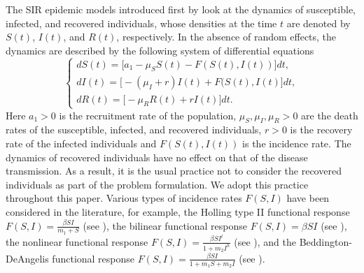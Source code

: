 \documentclass[12pt]{amsart}
\theoremstyle{remark}
\numberwithin{equation}{section}
\numberwithin{equation}{section}
\newcommand{\1}{\boldsymbol{1}}
\begin{document}
The SIR epidemic models introduced first by \cite{KER1,KER2} look at the dynamics of susceptible, infected, and recovered individuals, whose densities at the time $t$ are denoted by $S(t)$, $I(t)$, and $R(t)$, respectively. In the absence of random effects,
the dynamics  are
described
by the following system of differential equations
\begin{equation}\label{1.0}
\begin{cases}
dS(t)=\big[a_1-\mu_SS(t)-F(S(t),I(t))\big]dt, \\
dI(t)=\big[-(\mu_I+r)I(t) + F(S(t),I(t)\big]dt,\\
dR(t)=\big[-\mu_RR(t)+rI(t)\big]dt.
\end{cases}
\end{equation}
Here $a_1>0$ is the recruitment rate of the population, $\mu_S,\mu_I,\mu_R>0$ are the death rates of the susceptible, infected, and recovered individuals, $r>0$ is the recovery rate of the infected individuals and $F(S(t),I(t))$ is the incidence rate.
The dynamics of recovered individuals have no effect on that of the disease transmission.
As a result, it is the usual practice not to consider the recovered individuals as part of the problem formulation. We adopt this practice
throughout this paper.
 Various types of incidence rates $F(S,I)$ have been considered in the literature, for example,
the Holling type II functional response  $F(S,I)=\frac{\beta SI}{m_1+S}$ (see \cite{HUO}), the bilinear functional response $F(S,I)=\beta SI$ (see \cite{DANG,ZHANG}), the nonlinear functional response  $F(S,I)=\frac {\beta SI^l}{1+m_2I^h}$ (see \cite{RUAN,YANG}),
and the Beddington-DeAngelis functional response $F(S,I)=\frac{\beta SI}{1+m_1S+m_2I}$  (see \cite {NHU1, NHU2}).
\end{document}
